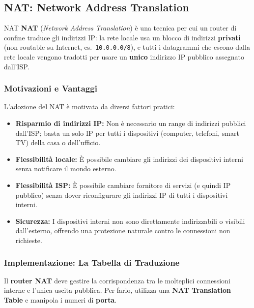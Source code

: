 \documentclass[a4paper,12pt]{report}
\begin{document}
\newpage


\newpage

\subsection{NAT: Network Address Translation}
\label{NAT}
\begin{defbox}{NAT}
\textbf{NAT} (\textit{Network Address Translation}) è una
tecnica per cui un router di confine traduce gli indirizzi IP:
la rete locale usa un blocco di indirizzi \textbf{privati}
(non routable su Internet, es.\ \texttt{10.0.0.0/8}), e tutti
i datagrammi che escono dalla rete locale vengono tradotti
per usare un \textbf{unico} indirizzo IP pubblico assegnato
dall'ISP.
\end{defbox}

\subsubsection{Motivazioni e Vantaggi}
L'adozione del NAT è motivata da diversi fattori pratici:
\begin{itemize}
    \item \textbf{Risparmio di indirizzi IP:} Non è necessario un range di indirizzi pubblici dall'ISP; basta un solo IP per tutti i dispositivi (computer, telefoni, smart TV) della casa o dell'ufficio.
    \item \textbf{Flessibilità locale:} È possibile cambiare gli indirizzi dei dispositivi interni senza notificare il mondo esterno.
    \item \textbf{Flessibilità ISP:} È possibile cambiare fornitore di servizi (e quindi IP pubblico) senza dover riconfigurare gli indirizzi IP di tutti i dispositivi interni.
    \item \textbf{Sicurezza:} I dispositivi interni non sono direttamente indirizzabili o visibili dall'esterno, offrendo una protezione naturale contro le connessioni non richieste.
\end{itemize}

\subsubsection{Implementazione: La Tabella di Traduzione}
Il \textbf{router NAT} deve gestire la corrispondenza tra le molteplici connessioni interne e l'unica uscita pubblica. Per farlo, utilizza una \textbf{NAT Translation Table} e manipola i numeri di \textbf{porta}.
\end{document}
